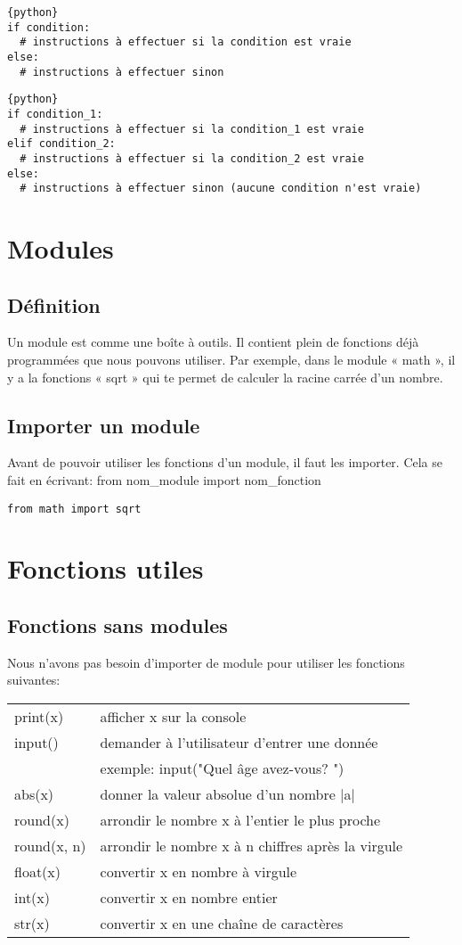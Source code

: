 \documentclass[a4paper,11pt]{article}
\begin{document}
\begin{verbatim}{python}
if condition:
  # instructions à effectuer si la condition est vraie
else:
  # instructions à effectuer sinon
\end{verbatim}

\begin{verbatim}{python}
if condition_1:
  # instructions à effectuer si la condition_1 est vraie
elif condition_2:
  # instructions à effectuer si la condition_2 est vraie
else:
  # instructions à effectuer sinon (aucune condition n'est vraie)
\end{verbatim}

\section{Modules}

\subsection{Définition}
Un module est comme une boîte à outils. Il contient plein de fonctions déjà programmées que nous pouvons utiliser.
Par exemple, dans le module « math », il y a la fonctions « sqrt » qui te permet de calculer la racine carrée d’un nombre.

\subsection{Importer un module}
Avant de pouvoir utiliser les fonctions d’un module, il faut les importer.
Cela se fait en écrivant: from nom\_module import nom\_fonction
\begin{lstlisting}
from math import sqrt
\end{lstlisting}

\section{Fonctions utiles}
\subsection{Fonctions sans modules}
Nous n'avons pas besoin d'importer de module pour utiliser les fonctions suivantes:\par
\begin{tabular}{l l}
print(x) & afficher x sur la console\\
input() & demander à l'utilisateur d'entrer une donnée\\
  & exemple: input("Quel âge avez-vous? ")\\
abs(x) & donner la valeur absolue d'un nombre |a| \\
round(x) & arrondir le nombre x à l'entier le plus proche\\
round(x, n) & arrondir le nombre x à n chiffres après la virgule\\
float(x) & convertir x en nombre à virgule\\
int(x) & convertir x en nombre entier\\
str(x) & convertir x en une chaîne de caractères\\
\end{tabular}
\end{document}
